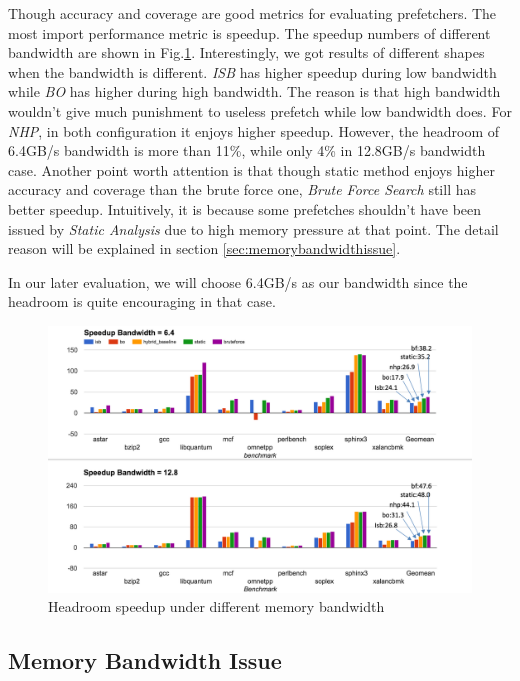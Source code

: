   Though accuracy and coverage are good metrics for evaluating prefetchers. The most import performance metric is speedup. The speedup numbers of different bandwidth are shown in Fig.\ref{fig:headroom_speedup}. Interestingly, we got results of different shapes when the bandwidth is different. \emph{ISB} has higher speedup during low bandwidth while \emph{BO} has higher during high bandwidth. The reason is that high bandwidth wouldn't give much punishment to useless prefetch while low bandwidth does. For \emph{NHP}, in both configuration it enjoys higher speedup. However, the headroom of 6.4GB/s bandwidth is more than 11\%, while only 4\% in 12.8GB/s bandwidth case. Another point worth attention is that though static method enjoys higher accuracy and coverage than the brute force one, \emph{Brute Force Search} still has better speedup. Intuitively, it is because some prefetches shouldn't have been issued by \emph{Static Analysis} due to high memory pressure at that point. The detail reason will be explained in section \ref{sec:memorybandwidthissue}.

  In our later evaluation, we will choose 6.4GB/s as our bandwidth since the headroom is quite encouraging in that case.


  \begin{figure}[ht!]
	   \centering
	   \includegraphics[width=1.0\textwidth]{images/headroom_speedup.png}
	   \caption{Headroom speedup under different memory bandwidth}
	  \label{fig:headroom_speedup}
  \end{figure}

  \subsection{Memory Bandwidth Issue}

